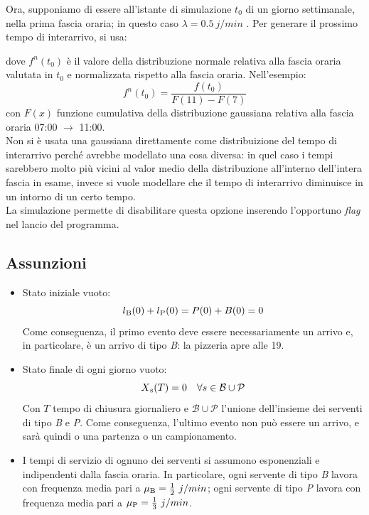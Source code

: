 \documentclass[a4paper, 12pt]{article}
\newcommand{\key}[1]{\texttt{\StrSubstitute{#1}{_}{\_}}}
\begin{document}
Ora, supponiamo di essere all'istante di simulazione $t_0$ di un giorno settimanale, nella prima fascia oraria; in questo caso $\lambda = 0.5\ j/min$ .  Per generare il prossimo tempo di interarrivo, si usa:
\begin{center}
\key{Exponential(1/$\lambda$) * $f^n(t0)$}
\end{center}
dove $f^n(t_0)$ è il valore della distribuzione normale relativa alla fascia oraria valutata in $t_0$ e normalizzata rispetto alla fascia oraria. Nell'esempio:
\[
f^n(t_0) = \frac{f(t_0)}{F(11) - F(7)}
\]
con $F(x)$ funzione cumulativa della distribuzione gaussiana relativa alla fascia oraria 07:00 $\rightarrow$ 11:00.\\

Non si è usata una gaussiana direttamente come distribuizione del tempo di interarrivo perché avrebbe modellato una cosa diversa: in quel caso i tempi sarebbero molto più vicini al valor medio della distribuzione all'interno dell'intera fascia in esame, invece si vuole modellare che il tempo di interarrivo diminuisce in un intorno di un certo tempo. \\

La simulazione permette di disabilitare questa opzione inserendo l'opportuno \textit{flag} nel lancio del programma.


\subsection{Assunzioni}
\begin{itemize}
  \item Stato iniziale vuoto: 
  \[ 
    l\textsubscript{B}(0) + l\textsubscript{P}(0) = P(0) + B(0) = 0 
\]
  Come conseguenza, il primo evento deve essere necessariamente un arrivo e, in particolare, è un arrivo di tipo \textit{B}: la pizzeria apre alle 19.
  \item Stato finale di ogni giorno vuoto:
\[
    X\textsubscript{s}(T) = 0\ \ \ \forall s \in \mathcal{B} \cup \mathcal{P}
\]
  Con $T$ tempo di chiusura giornaliero e $\mathcal{B} \cup \mathcal{P}$ l'unione dell'insieme dei serventi di tipo \textit{B} e \textit{P}. Come conseguenza, l'ultimo evento non può essere un arrivo, e sarà quindi o una partenza o un campionamento.

  \item I tempi di servizio di ognuno dei serventi si assumono  esponenziali e indipendenti dalla fascia oraria. In particolare, ogni servente di tipo \textit{B} lavora con frequenza media pari a $\mu\textsubscript{B} = \frac{1}{2}\ j/min$; ogni servente di tipo \textit{P} lavora con frequenza media pari a $\mu\textsubscript{P} = \frac{1}{3}\ j/min$. 
\end{itemize}
\end{document}
